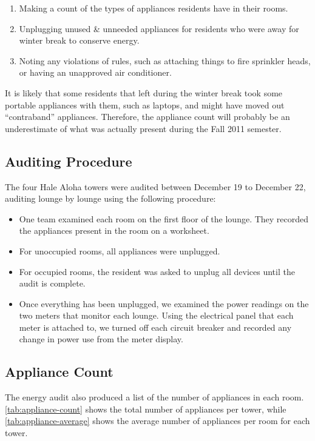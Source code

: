 \begin{enumerate}
\item Making a count of the types of appliances residents have in their rooms.
\item Unplugging unused \& unneeded appliances for residents who were away for winter break to conserve energy.
\item Noting any violations of rules, such as attaching things to fire sprinkler heads, or having an unapproved air conditioner.
\end{enumerate}

It is likely that some residents that left during the winter break took some portable appliances with them, such as laptops, and might have moved out ``contraband'' appliances. Therefore, the appliance count will probably be an underestimate of what was actually present during the Fall 2011 semester.


\subsection{Auditing Procedure}

The four Hale Aloha towers were audited between December 19 to December 22, auditing lounge by lounge using the following procedure:

\begin{itemize}
	\item One team examined each room on the first floor of the lounge. They recorded the appliances present in the room on a worksheet.
	\item For unoccupied rooms, all appliances were unplugged.
	\item For occupied rooms, the resident was asked to unplug all devices until the audit is complete.
	\item Once everything has been unplugged, we examined the power readings on the two meters that monitor each lounge. Using the electrical panel that each meter is attached to, we turned off each circuit breaker and recorded any change in power use from the meter display.
\end{itemize}


\subsection{Appliance Count}
\label{sec:appliance-count}

The energy audit also produced a list of the number of appliances in each room. \autoref{tab:appliance-count} shows the total number of appliances per tower, while \autoref{tab:appliance-average} shows the average number of appliances per room for each tower.

